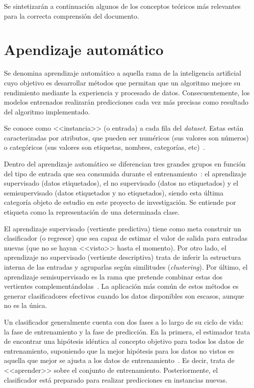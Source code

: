 
Se sintetizarán a continuación algunos de los conceptos teóricos más relevantes para la correcta comprensión del documento.

\section{Apendizaje automático}

Se denomina aprendizaje automático a aquella rama de la inteligencia artificial cuyo objetivo es desarrollar métodos que permitan que un algoritmo mejore su rendimiento mediante la experiencia y procesado de datos. Consecuentemente, los modelos entrenados realizarán predicciones cada vez más precisas como resultado del algoritmo implementado.

Se conoce como <<instancia>> (o entrada) a cada fila del \textit{dataset}. Estas están caracterizadas por atributos, que pueden ser numéricos (sus valores son números) o categóricos (sus valores son etiquetas, nombres, categorías, etc)~\cite{apuntesSisint}.

Dentro del aprendizaje automático se diferencian tres grandes grupos en función del tipo de entrada que sea consumida durante el entrenamiento~\cite{engelen2020surveyOnSemiSupervised}: el aprendizaje supervisado (datos etiquetados), el no supervisado (datos no etiquetados) y el semisupervisado (datos etiquetados y no etiquetados), siendo esta última categoría objeto de estudio en este proyecto de investigación. Se entiende por etiqueta como la representación de una determinada clase. 

El aprendizaje supervisado (vertiente predictiva) tiene como meta construir un clasificador (o regresor) que sea capaz de estimar el valor de salida para entradas nuevas (que no se hayan <<visto>> hasta el momento). Por otro lado, el aprendizaje no supervisado (vertiente descriptiva) trata de inferir la estructura interna de las entradas y agruparlas según similitudes (\textit{clustering}). Por último, el aprendizaje semisupervisado es la rama que pretende combinar estas dos vertientes complementándolas~\cite{engelen2020surveyOnSemiSupervised}. La aplicación más común de estos métodos es generar clasificadores efectivos cuando los datos disponibles son escasos, aunque no es la única.

Un clasificador generalmente cuenta con dos fases a lo largo de su ciclo de vida: la fase de entrenamiento y la fase de predicción. En la primera, el estimador trata de encontrar una hipótesis idéntica al concepto objetivo para todos los datos de entrenamiento, suponiendo que la mejor hipótesis para los datos no vistos es aquella que mejor se ajusta a los datos de entrenamiento~\cite{mitchell1997machine}. Es decir, trata de <<aprender>> sobre el conjunto de entrenamiento. Posteriormente, el clasificador está preparado para realizar predicciones en instancias nuevas.

